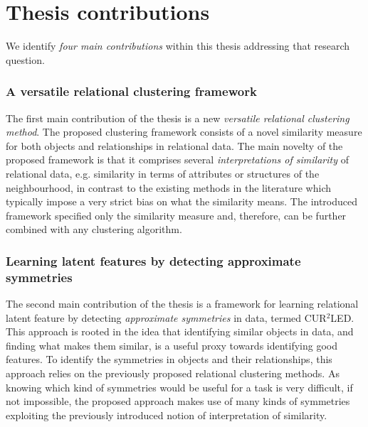 


\section{Thesis contributions}




We identify \textit{four main contributions} within this thesis addressing that research question.



\subsubsection{A versatile relational clustering framework}

The first main contribution of the thesis is a new \textit{versatile relational clustering method}.
The proposed clustering framework consists of a novel similarity measure for both objects and relationships in relational data.
The main novelty of the proposed framework is that it comprises several \textit{interpretations of similarity} of relational data, e.g. similarity in terms of attributes or structures of the neighbourhood, in contrast to the existing methods in the literature which typically impose a very strict bias on what the similarity means.
The introduced framework specified only the similarity measure and, therefore, can be further combined with any clustering algorithm.




\subsubsection{Learning latent features by detecting approximate symmetries}

The second main contribution of the thesis is a framework for learning relational latent feature by detecting \textit{approximate symmetries} in data, termed CUR$^2$LED.
This approach is rooted in the idea that identifying similar objects in data, and finding what makes them similar, is a useful proxy towards identifying good features.
To identify the symmetries in objects and their relationships, this approach relies on the previously proposed relational clustering methods.
As knowing which kind of symmetries would be useful for a task is very difficult, if not impossible, the proposed approach makes use of many kinds of symmetries exploiting the previously introduced notion of interpretation of similarity.
 






